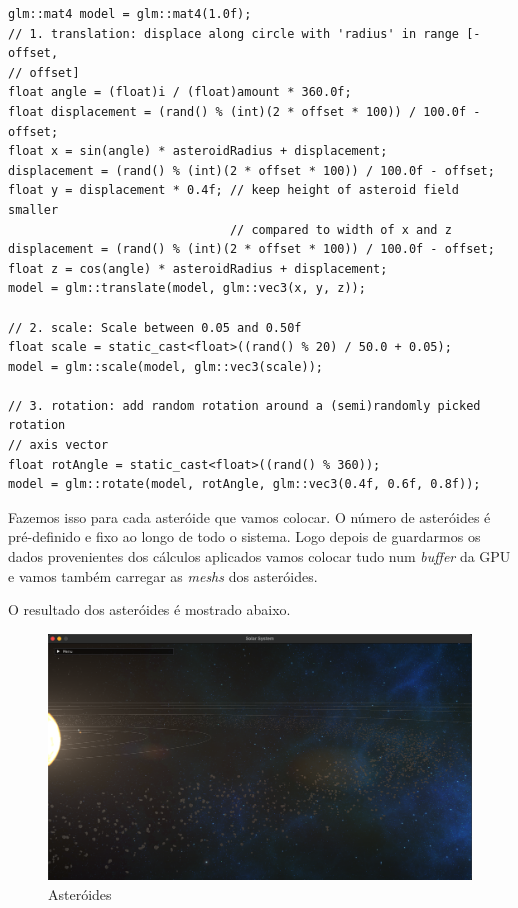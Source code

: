 \begin{lstlisting}[style=Cpp, caption=Colisões parte 2]
glm::mat4 model = glm::mat4(1.0f);
// 1. translation: displace along circle with 'radius' in range [-offset,
// offset]
float angle = (float)i / (float)amount * 360.0f;
float displacement = (rand() % (int)(2 * offset * 100)) / 100.0f - offset;
float x = sin(angle) * asteroidRadius + displacement;
displacement = (rand() % (int)(2 * offset * 100)) / 100.0f - offset;
float y = displacement * 0.4f; // keep height of asteroid field smaller
                               // compared to width of x and z
displacement = (rand() % (int)(2 * offset * 100)) / 100.0f - offset;
float z = cos(angle) * asteroidRadius + displacement;
model = glm::translate(model, glm::vec3(x, y, z));

// 2. scale: Scale between 0.05 and 0.50f
float scale = static_cast<float>((rand() % 20) / 50.0 + 0.05);
model = glm::scale(model, glm::vec3(scale));

// 3. rotation: add random rotation around a (semi)randomly picked rotation
// axis vector
float rotAngle = static_cast<float>((rand() % 360));
model = glm::rotate(model, rotAngle, glm::vec3(0.4f, 0.6f, 0.8f));
\end{lstlisting}

\noindent
Fazemos isso para cada asteróide que vamos colocar. O número de asteróides é pré-definido e fixo ao longo de todo o sistema. Logo depois de guardarmos os dados provenientes dos cálculos aplicados vamos colocar tudo num \textit{buffer} da \ac{GPU} e vamos também carregar as \textit{meshs} dos asteróides.

\noindent
O resultado dos asteróides é mostrado abaixo.

\enlargethispage{1in}
\thispagestyle{empty}
\begin{figure}[h]
\centering
\includegraphics[width=400pt]{asteroides.png}
\caption{Asteróides}
\end{figure}

